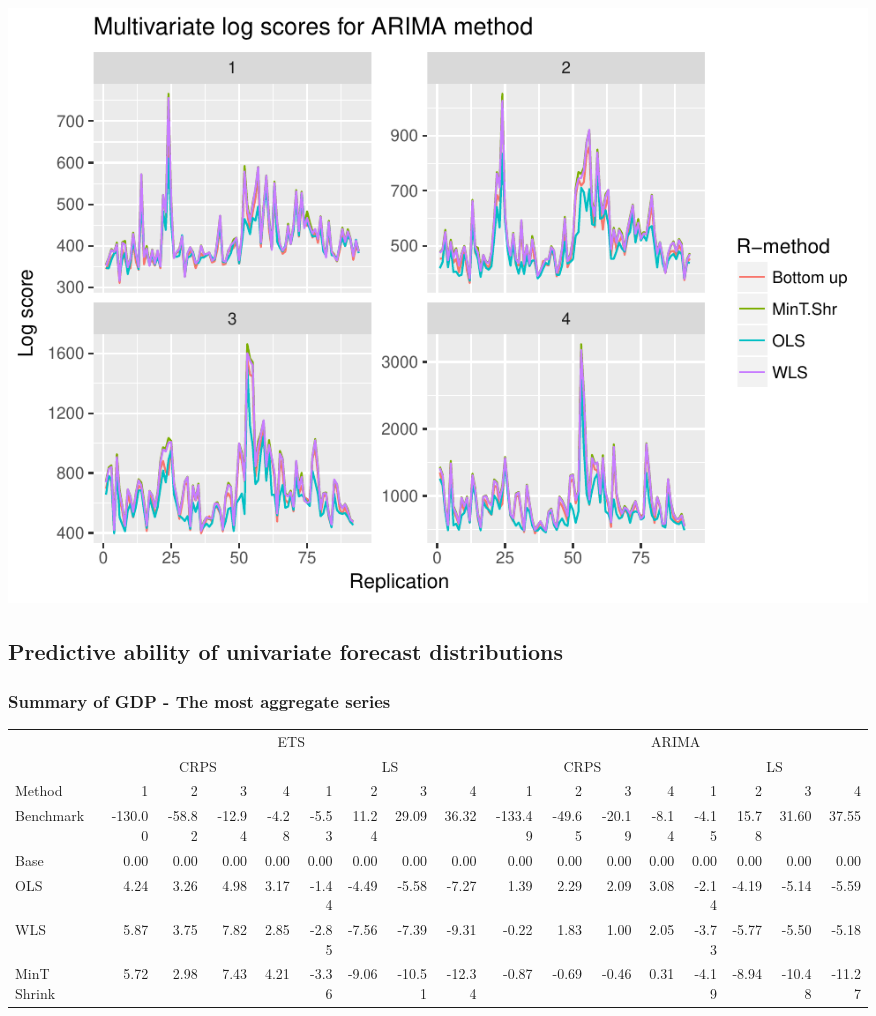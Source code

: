 \documentclass[]{article}
\begin{document}
\includegraphics{Expenditure-approach-results_files/figure-latex/unnamed-chunk-14-2.pdf}

\subsection{Predictive ability of univariate forecast
distributions}\label{predictive-ability-of-univariate-forecast-distributions-1}

\subsubsection{Summary of GDP - The most aggregate
series}\label{summary-of-gdp---the-most-aggregate-series-2}

\begin{table}[H]
\centering
\begin{tabular}{l|r|r|r|r|r|r|r|r|r|r|r|r|r|r|r|r}
\hline
\multicolumn{1}{c|}{ } & \multicolumn{8}{|c|}{ETS} & \multicolumn{8}{|c}{ARIMA} \\
\cline{2-9} \cline{10-17}
\multicolumn{1}{c|}{ } & \multicolumn{4}{|c|}{CRPS} & \multicolumn{4}{|c|}{LS} & \multicolumn{4}{|c|}{CRPS} & \multicolumn{4}{|c}{LS} \\
\cline{2-5} \cline{6-9} \cline{10-13} \cline{14-17}
Method & 1 & 2 & 3 & 4 & 1 & 2 & 3 & 4 & 1 & 2 & 3 & 4 & 1 & 2 & 3 & 4\\
\hline
Benchmark & -130.00 & -58.82 & -12.94 & -4.28 & -5.53 & 11.24 & 29.09 & 36.32 & -133.49 & -49.65 & -20.19 & -8.14 & -4.15 & 15.78 & 31.60 & 37.55\\
\hline
Base & 0.00 & 0.00 & 0.00 & 0.00 & 0.00 & 0.00 & 0.00 & 0.00 & 0.00 & 0.00 & 0.00 & 0.00 & 0.00 & 0.00 & 0.00 & 0.00\\
\hline
OLS & 4.24 & 3.26 & 4.98 & 3.17 & -1.44 & -4.49 & -5.58 & -7.27 & 1.39 & 2.29 & 2.09 & 3.08 & -2.14 & -4.19 & -5.14 & -5.59\\
\hline
WLS & 5.87 & 3.75 & 7.82 & 2.85 & -2.85 & -7.56 & -7.39 & -9.31 & -0.22 & 1.83 & 1.00 & 2.05 & -3.73 & -5.77 & -5.50 & -5.18\\
\hline
MinT Shrink & 5.72 & 2.98 & 7.43 & 4.21 & -3.36 & -9.06 & -10.51 & -12.34 & -0.87 & -0.69 & -0.46 & 0.31 & -4.19 & -8.94 & -10.48 & -11.27\\
\hline
\end{tabular}
\end{table}
\end{document}
